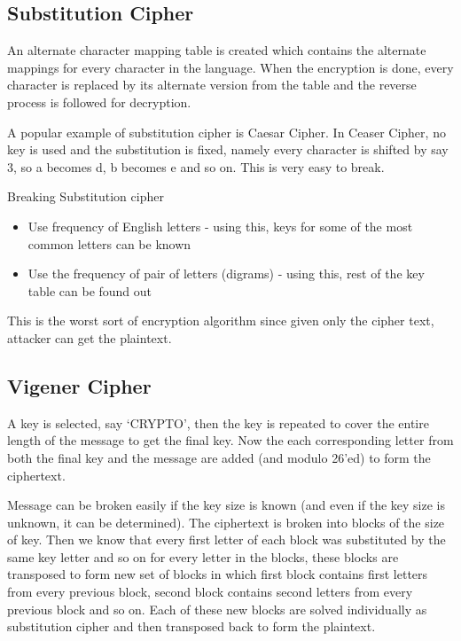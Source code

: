 \documentclass[a4paper, 12pt]{article}
\begin{document}
\subsection{Substitution Cipher}

An alternate character mapping table is created which contains the alternate mappings for every character in the language. When the encryption is done, every character is replaced by its alternate version from the table and the reverse process is followed for decryption.

A popular example of substitution cipher is Caesar Cipher. In Ceaser Cipher, no key is used and the substitution is fixed, namely every character is shifted by say 3, so a becomes d, b becomes e and so on. This is very easy to break.

\noindent
Breaking Substitution cipher

\begin{itemize}
    \item Use frequency of English letters - using this, keys for some of the most common letters can be known
    \item Use the frequency of pair of letters (digrams) - using this, rest of the key table can be found out
\end{itemize}

This is the worst sort of encryption algorithm since given only the cipher text, attacker can get the plaintext.

\subsection{Vigener Cipher}

A key is selected, say `CRYPTO', then the key is repeated to cover the entire length of the message to get the final key. Now the each corresponding letter from both the final key and the message are added (and modulo 26'ed) to form the ciphertext.

Message can be broken easily if the key size is known (and even if the key size is unknown, it can be determined). The ciphertext is broken into blocks of the size of key. Then we know that every first letter of each block was substituted by the same key letter and so on for every letter in the blocks, these blocks are transposed to form new set of blocks in which first block contains first letters from every previous block, second block contains second letters from every previous block and so on. Each of these new blocks are solved individually as substitution cipher and then transposed back to form the plaintext.
\end{document}
